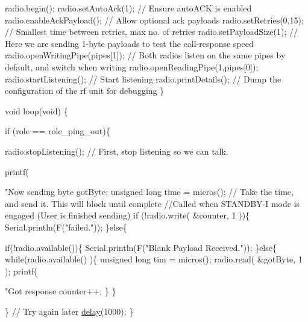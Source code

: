\begin{DoxyCodeInclude}
  radio.begin();
  radio.setAutoAck(1);                    \textcolor{comment}{// Ensure autoACK is enabled}
  radio.enableAckPayload();               \textcolor{comment}{// Allow optional ack payloads}
  radio.setRetries(0,15);                 \textcolor{comment}{// Smallest time between retries, max no. of retries}
  radio.setPayloadSize(1);                \textcolor{comment}{// Here we are sending 1-byte payloads to test the call-response
       speed}
  radio.openWritingPipe(pipes[1]);        \textcolor{comment}{// Both radios listen on the same pipes by default, and switch
       when writing}
  radio.openReadingPipe(1,pipes[0]);
  radio.startListening();                 \textcolor{comment}{// Start listening}
  radio.printDetails();                   \textcolor{comment}{// Dump the configuration of the rf unit for debugging}
\}

\textcolor{keywordtype}{void} loop(\textcolor{keywordtype}{void}) \{

  \textcolor{keywordflow}{if} (role == role\_ping\_out)\{
    
    radio.stopListening();                                  \textcolor{comment}{// First, stop listening so we can talk.}
        
    printf(\textcolor{stringliteral}{"Now sending %
    byte gotByte;  
    \textcolor{keywordtype}{unsigned} \textcolor{keywordtype}{long} time = micros();                          \textcolor{comment}{// Take the time, and send it.  This will block
       until complete   }
                                                            \textcolor{comment}{//Called when STANDBY-I mode is engaged (User
       is finished sending)}
    \textcolor{keywordflow}{if} (!radio.write( &counter, 1 ))\{
      Serial.println(F(\textcolor{stringliteral}{"failed."}));      
    \}\textcolor{keywordflow}{else}\{

      \textcolor{keywordflow}{if}(!radio.available())\{ 
        Serial.println(F(\textcolor{stringliteral}{"Blank Payload Received."})); 
      \}\textcolor{keywordflow}{else}\{
        \textcolor{keywordflow}{while}(radio.available() )\{
          \textcolor{keywordtype}{unsigned} \textcolor{keywordtype}{long} tim = micros();
          radio.read( &gotByte, 1 );
          printf(\textcolor{stringliteral}{"Got response %
          counter++;
        \}
      \}

    \}
    \textcolor{comment}{// Try again later}
    \hyperlink{group__Porting__General_ga70a331e8ddf9acf9d33c47b71cda4c5f}{delay}(1000);
  \}

}}
\end{DoxyCodeInclude}
